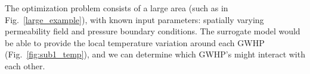 \documentclass{article} %
\begin{document}





The optimization problem consists of a large area (such as in Fig.~\ref{large_example}), with known input parameters: spatially varying permeability field and pressure boundary conditions. 
The surrogate model would be able to provide the local temperature variation around each GWHP (Fig.~\ref{fig:sub1_temp}), and we can determine which GWHP's might interact with each other.
\end{document}
